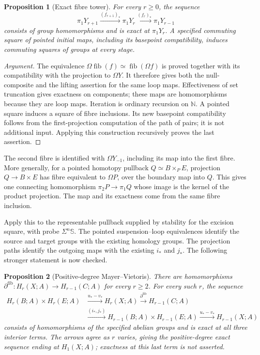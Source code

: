 \documentclass[11pt,a4paper]{amsart}
\newtheorem{proposition}{Proposition}[section]
\theoremstyle{definition}
\newcommand{\fib}{\operatorname{fib}}
\newcommand{\sph}{\mathbb S}
\begin{document}
\begin{proposition}[Exact fibre tower]
For every $r\geq0$, the sequence
\[
 \pi_1Y_{r+1}\xrightarrow{(f_{r+1})_*}\pi_1Y_r
 \xrightarrow{(f_r)_*}\pi_1Y_{r-1}
\]
consists of group homomorphisms and is exact at $\pi_1Y_r$.
A specified commuting square of pointed initial maps, including its
basepoint compatibility, induces commuting squares of groups at every
stage.
\end{proposition}

\begin{proof}[Argument]
The equivalence
$\Omega\fib(f)\simeq\fib(\Omega f)$ is proved together with its
compatibility with the projection to $\Omega Y$. It therefore gives
both the null-composite and the lifting assertion for the same loop
maps. Effectiveness of set truncation gives exactness on components;
these maps are homomorphisms because they are loop maps. Iteration is
ordinary recursion on $\mathbb N$. A pointed square induces a square
of fibre inclusions. Its new basepoint compatibility follows from the
first-projection computation of the path of pairs; it is not additional
input. Applying this construction recursively proves the last assertion.
\end{proof}

The second fibre is identified with $\Omega Y_{-1}$, including its
map into the first fibre. More generally, for a pointed homotopy
pullback $Q\simeq B\times_P E$, projection
$Q\to B\times E$ has fibre equivalent to $\Omega P$, over the boundary
map into $Q$. This gives one connecting homomorphism
$\pi_2P\to\pi_1Q$ whose image is the kernel of the product projection.
The map and its exactness come from the same fibre inclusion.

Apply this to the representable pullback supplied by stability for
the excision square, with probe $\Sigma^n\sph$. The pointed
suspension--loop equivalences identify the source and target groups
with the existing homology groups. The projection paths identify the
outgoing maps with the existing $i_*$ and $j_*$. The following stronger
statement is now checked.

\begin{proposition}[Positive-degree Mayer--Vietoris]
There are homomorphisms
$\partial^{\mathrm{fib}}:H_r(X;A)\to H_{r-1}(C;A)$ for every $r\geq2$.
For every such $r$, the sequence
\[
\begin{aligned}
 H_r(B;A)\times H_r(E;A)&\xrightarrow{u_*-v_*}H_r(X;A)
 \xrightarrow{\partial^{\mathrm{fib}}}H_{r-1}(C;A)\\
 &\xrightarrow{(i_*,j_*)}H_{r-1}(B;A)\times H_{r-1}(E;A)
 \xrightarrow{u_*-v_*}H_{r-1}(X;A)
\end{aligned}
\]
consists of homomorphisms of the specified abelian groups and is exact
at all three interior terms. The arrows agree as $r$ varies, giving
the positive-degree exact sequence ending at $H_1(X;A)$; exactness at
this last term is not asserted.
\end{proposition}
\end{document}

